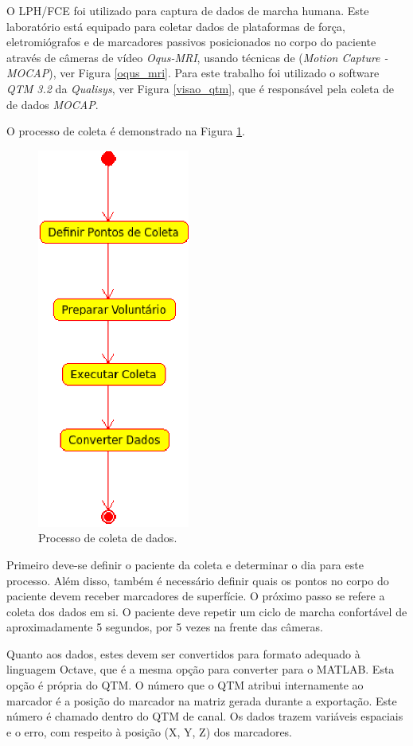 O LPH/FCE foi utilizado para captura de dados de marcha humana. 
Este laboratório está equipado para coletar dados de plataformas de força, eletromiógrafos e de marcadores passivos posicionados no corpo do paciente através de câmeras de vídeo \emph{Oqus-MRI}, usando técnicas de (\emph{Motion Capture - MOCAP}), ver Figura \ref{oqus_mri}. 
Para este trabalho foi utilizado o software \emph{QTM 3.2} da \emph{Qualisys}, ver Figura \ref{visao_qtm}, que é responsável pela coleta de de dados \emph{MOCAP}. 

O processo de coleta é demonstrado na Figura \ref{coleta}.

\begin{figure}[ht]
	\centering
	\includegraphics[width=5cm]{figuras/coleta.eps}
	\caption{Processo de coleta de dados.}
	\label{coleta}
\end{figure}

Primeiro deve-se definir o paciente da coleta e determinar o dia para este processo. 
Além disso, também é necessário definir quais os pontos no corpo do paciente devem receber marcadores de superfície. 
O próximo passo se refere a coleta dos dados em si. 
O paciente deve repetir um ciclo de marcha confortável de aproximadamente 5 segundos, por 5 vezes na frente das câmeras.

Quanto aos dados, estes devem ser convertidos para formato adequado à linguagem Octave, que é a mesma opção para converter para o MATLAB. 
Esta opção é própria do QTM. 
O número que o QTM atribui internamente ao marcador é a posição do marcador na matriz gerada durante a exportação. Este número é chamado dentro do QTM de canal. Os dados trazem variáveis espaciais e o erro, com respeito à posição (X, Y, Z) dos marcadores.

